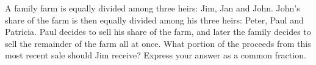 A family farm is equally divided among three heirs: Jim, Jan and John. John's share of the farm is then equally divided among his three heirs: Peter, Paul and Patricia. Paul decides to sell his share of the farm, and later the family decides to sell the remainder of the farm all at once. What portion of the proceeds from this most recent sale should Jim receive? Express your answer as a common fraction.
